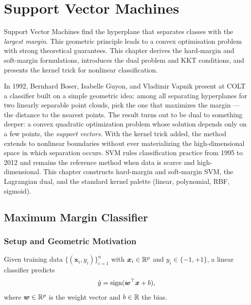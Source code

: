 \chapter{Support Vector Machines}\label{ch:svm}

\begin{intuition}[title=\textbf{Chapter Overview}]
Support Vector Machines find the hyperplane that separates classes with the \emph{largest margin}. This geometric principle leads to a convex optimisation problem with strong theoretical guarantees. This chapter derives the hard-margin and soft-margin formulations, introduces the dual problem and KKT conditions, and presents the kernel trick for nonlinear classification.
\end{intuition}

In 1992, Bernhard Boser, Isabelle Guyon, and Vladimir Vapnik present at COLT a classifier built on a simple geometric idea: among all separating hyperplanes for two linearly separable point clouds, pick the one that maximizes the margin --- the distance to the nearest points. The result turns out to be dual to something deeper: a convex quadratic optimization problem whose solution depends only on a few points, the \emph{support vectors}. With the kernel trick added, the method extends to nonlinear boundaries without ever materializing the high-dimensional space in which separation occurs. SVM rules classification practice from 1995 to 2012 and remains the reference method when data is scarce and high-dimensional. This chapter constructs hard-margin and soft-margin SVM, the Lagrangian dual, and the standard kernel palette (linear, polynomial, RBF, sigmoid).

\section{Maximum Margin Classifier}

\subsection{Setup and Geometric Motivation}

\begin{definition}
Given training data $\{(\bm{x}_i, y_i)\}_{i=1}^{n}$ with $\bm{x}_i \in \mathbb{R}^p$ and $y_i \in \{-1, +1\}$, a linear classifier predicts
\[
    \hat{y} = \mathrm{sign}(\bm{w}^\top\bm{x} + b),
\]
where $\bm{w} \in \mathbb{R}^p$ is the weight vector and $b \in \mathbb{R}$ the bias.
\end{definition}

